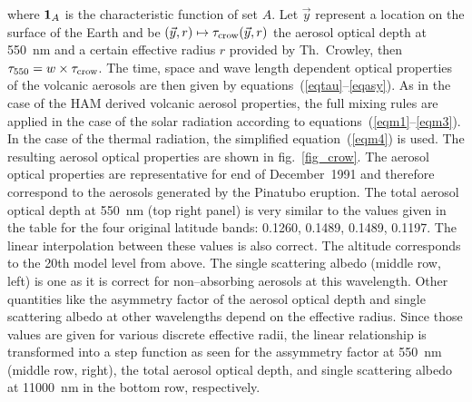 \begin{appendix}
where ${\bf 1}_{A}$ is the characteristic function of set $A$. Let
$\vec{y}$ represent a location on the surface of the Earth and be
$(\vec{y},r)\mapsto\tau_{\rm crow}(\vec{y},r)$ the aerosol optical depth at
550~nm and a certain effective radius $r$ provided by Th.~Crowley, then 
$\tau_{550}=w\times\tau_{\rm crow}$. The time, space and wave length
dependent optical properties of the volcanic aerosols are then given
by equations~(\ref{eqtau}--\ref{eqasy}). As in the case of the HAM
derived volcanic aerosol properties, the full mixing rules are applied
in the case of the solar radiation according to
equations~(\ref{eqm1}--\ref{eqm3}). In the case of the thermal
radiation, the simplified
equation~(\ref{eqm4}) is used.
The resulting aerosol optical properties are shown in
fig.~\ref{fig_crow}. The aerosol
  optical properties are representative for end of December~1991 and
  therefore correspond to the aerosols generated by the Pinatubo
  eruption. The total aerosol optical depth at 550~nm (top right panel) is very
  similar to the values given in the table for the four original
  latitude bands:
  0.1260, 0.1489, 0.1489, 0.1197. The linear interpolation between
  these values is also correct. The altitude corresponds to the 20th
  model level from above. The single scattering albedo (middle row,
  left) is one as it is correct for non--absorbing aerosols at this
  wavelength. Other quantities like the 
  asymmetry factor of the aerosol optical depth and single scattering
  albedo at other wavelengths depend on the effective radius. Since
  those values are given for various discrete effective radii,
  the linear relationship is transformed into a step function as seen for
  the assymmetry factor at 550~nm (middle row, right), the total
  aerosol optical depth, and single scattering albedo at 11000~nm in
  the bottom row, respectively. 


\end{appendix}
